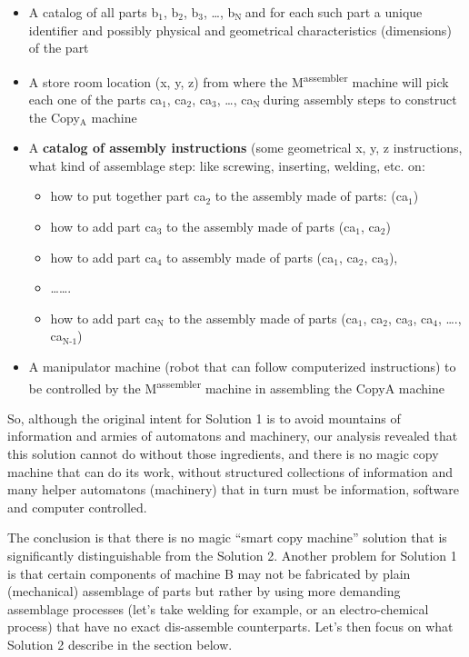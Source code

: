\documentclass[letterpaper]{article}
\newcommand\textsubscript[1]{\ensuremath{{}_{\text{#1}}}}
\begin{document}
\begin{itemize}
\item A catalog of all parts b\textsubscript{1}, b\textsubscript{2},
b\textsubscript{3}, …, b\textsubscript{N  }and for each such part a
unique identifier and possibly physical and geometrical characteristics
(dimensions) of the part
\item A store room location (x, y, z)  from where the
M\textsuperscript{assembler} machine will pick each one of the parts
ca\textsubscript{1}, ca\textsubscript{2}, ca\textsubscript{3}, …,
ca\textsubscript{N }during assembly steps to construct the
Copy\textsubscript{A} machine
\item A \textbf{catalog of assembly instructions} (some geometrical x,
y, z instructions, what kind of assemblage step: like screwing,
inserting, welding, etc. on:

\begin{itemize}
\item how to put together part ca\textsubscript{2} to the assembly made
of parts: (ca\textsubscript{1})
\item how to add part ca\textsubscript{3} to the assembly made of parts
(ca\textsubscript{1}, ca\textsubscript{2})
\item how to add part ca\textsubscript{4} to assembly made of parts
(ca\textsubscript{1}, ca\textsubscript{2}, ca\textsubscript{3}),
\item …….
\item how to add part ca\textsubscript{N} to the assembly made of parts
(ca\textsubscript{1}, ca\textsubscript{2}, ca\textsubscript{3},
ca\textsubscript{4}, …., ca\textsubscript{N-1})
\end{itemize}
\item A manipulator machine (robot that can follow computerized
instructions) to  be controlled by the M\textsuperscript{assembler}
machine in assembling the CopyA machine
\end{itemize}
So, although the original intent for Solution 1 is to avoid mountains of
information and armies of automatons and machinery, our analysis
revealed that this solution cannot do without those ingredients, and
there is no magic copy machine that can do its work, without structured
collections of information and many helper automatons (machinery) that
in turn must be information, software and computer controlled.

The conclusion is that there is no magic “smart copy machine” solution
that is significantly distinguishable from the Solution 2. Another
problem for Solution 1 is that certain components of machine B may not
be fabricated by plain (mechanical) assemblage of parts but rather by
using more demanding assemblage processes (let’s take welding for
example, or an electro-chemical process) that have no exact
dis-assemble counterparts. Let’s then focus on what Solution 2 describe
in the section below.
\end{document}
